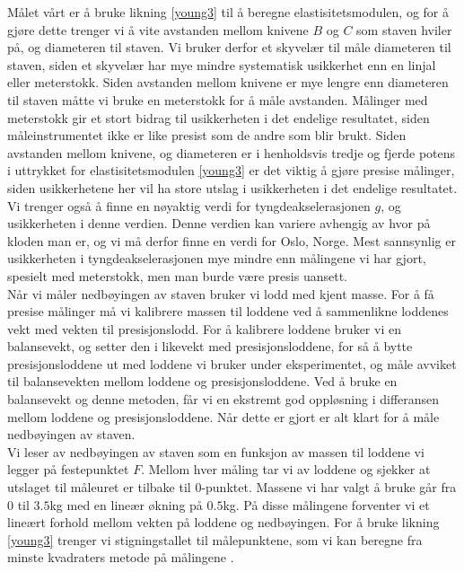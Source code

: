 \documentclass[%
 reprint,
nofootinbib,
aps,
]{revtex4-1}
\begin{document}
Målet vårt er å bruke likning \eqref{young3} til å beregne elastisitetsmodulen, og for å gjøre dette trenger vi å vite avstanden mellom knivene $B$ og $C$ som staven hviler på, og diameteren til staven. Vi bruker derfor et skyvelær til måle diameteren til staven, siden et skyvelær har mye mindre systematisk usikkerhet enn en linjal eller meterstokk. Siden avstanden mellom knivene er mye lengre enn diameteren til staven måtte vi bruke en meterstokk for å måle avstanden. Målinger med meterstokk gir et stort bidrag til usikkerheten i det endelige resultatet, siden måleinstrumentet ikke er like presist som de andre som blir brukt. Siden avstanden mellom knivene, og diameteren er i henholdsvis tredje og fjerde potens i uttrykket for elastisitetsmodulen \eqref{young3} er det viktig å gjøre presise målinger, siden usikkerhetene her vil ha store utslag i usikkerheten i det endelige resultatet. Vi trenger også å finne en nøyaktig verdi for tyngdeakselerasjonen $g$, og usikkerheten i denne verdien. Denne verdien kan variere avhengig av hvor på kloden man er, og vi må derfor finne en verdi for Oslo, Norge. Mest sannsynlig er usikkerheten i tyngdeakselerasjonen mye mindre enn målingene vi har gjort, spesielt med meterstokk, men man burde være  presis uansett.\\
Når vi måler nedbøyingen av staven bruker vi lodd med kjent masse. For å få presise målinger må vi kalibrere massen til loddene ved å sammenlikne loddenes vekt med vekten til presisjonslodd. For å kalibrere loddene bruker vi en balansevekt, og setter den i likevekt med presisjonsloddene, for så å bytte presisjonsloddene ut med loddene vi bruker under eksperimentet, og måle avviket til balansevekten mellom loddene og presisjonsloddene. Ved å bruke en balansevekt og denne metoden, får vi en ekstremt god oppløsning i differansen mellom loddene og presisjonsloddene. Når dette er gjort er alt klart for å måle nedbøyingen av staven.\\
Vi leser av nedbøyingen av staven som en funksjon av massen til loddene vi legger på festepunktet $F$. Mellom hver måling tar vi av loddene og sjekker at utslaget til måleuret er tilbake til $0$-punktet. Massene vi har valgt å bruke går fra $0$ til $3.5$kg med en lineær økning på $0.5$kg. På disse målingene forventer vi et lineært forhold mellom vekten på loddene og nedbøyingen. For å bruke likning \eqref{young3} trenger vi stigningstallet til målepunktene, som vi kan beregne fra minste kvadraters metode på målingene \cite{squires}. \\
\end{document}
